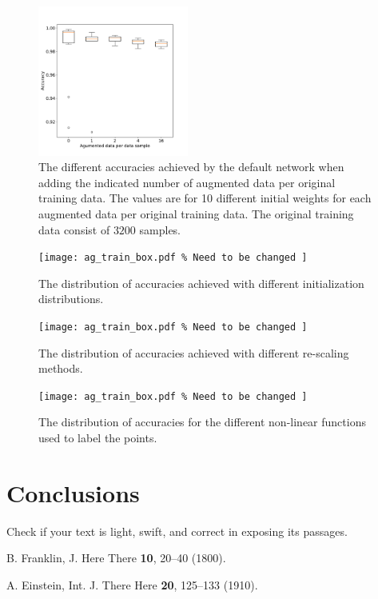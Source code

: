 \documentclass[prl,twocolumn]{revtex4-1}
\begin{document}
\begin{figure}[!tb]
  \includegraphics[width=0.44\textwidth]{ag_train_box.pdf}
  \caption{The different accuracies achieved by the default network when adding the indicated number of augmented data per original training data. The values are for 10 different initial weights for each augmented data per original training data. The original training data consist of $3200$ samples.}
  \label{fig:augmented_train_sampels}
\end{figure}


\begin{figure}[!tb]
  \texttt{[image: 
  ag\_train\_box.pdf \% Need to be changed
  ]}
  \caption{
  The distribution of accuracies achieved with different initialization distributions. 
  }
  \label{fig:weight_init_box}
\end{figure}


\begin{figure}[!tb]
  \texttt{[image: 
  ag\_train\_box.pdf \% Need to be changed
  ]}
  \caption{
  The distribution of accuracies achieved with different re-scaling methods. 
  }
  \label{fig:rescale_box}
\end{figure}

\begin{figure}[!tb]
  \texttt{[image: 
  ag\_train\_box.pdf \% Need to be changed
  ]}
  \caption{
  The distribution of accuracies for the different non-linear functions used to label the points. 
  }
  \label{fig:rescale_box}
\end{figure}




\section{Conclusions}


Check if your text is light, swift, and correct in exposing its passages.





\begin{thebibliography}{99}

  B. Franklin,
  J. Here There {\bf 10}, 20--40 (1800).
  
  A. Einstein,
  Int. J. There Here {\bf 20}, 125--133 (1910).
  
\end{thebibliography}

\clearpage

\end{document}
